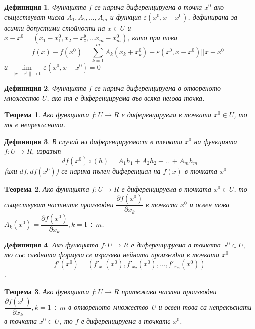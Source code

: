 \documentclass[fleqn]{article}
\newtheorem{theorem}{Tеорема}[subsection]
\newtheorem{definition}{Дефиниция}[subsection]
\begin{document}
\begin{definition}
Функцията $f$ се нарича диференцируема в точка $x^0$ ако съществуват числа $A_1, A_2, ..., A_m$ и функция $\varepsilon (x^0, x - x^0)$, дефинирана за всички допустими стойности на $x \in U$ и $x - x^0 = (x_1 - x_1 ^0, x_2 - x_2 ^0,... x_m - x_m ^0)$, като при това 
$$f(x) - f(x^0) = \sum_{k=1}^{m} A_k(x_k + x_k ^ 0) + \varepsilon (x^0, x - x^0) ||x - x^0||$$ 
и $\lim\limits_{|| x - x^0|| \rightarrow 0}\varepsilon (x^0, x - x^0) = 0$
\end{definition}

\begin{definition}
Функцията $f$ се нарича диференцируема в отвореното множество $U$, ако тя е диференцируема във всяка негова точка. 
\end{definition}

\begin{theorem}
Ако функцията $f: U \rightarrow R$ е диференцируема в точката $x^0 \in U$, то тя е непрекъсната. 
\end{theorem}

\begin{definition}
В случай на диференцируемост в точката $x^0$ на функцията $f: U \rightarrow R$, изразът 
$$df(x^0) \circ (h) = A_1 h_1 + A_2 h_2 + ... + A_m h_m$$
(или $df, df(x^0)$) се нарича пълен диференциал на $f(x)$ в точката $x^0$
\end{definition}

\begin{theorem}
Ако функцията $f: U \rightarrow R$ е диференцируема в точката $x^0 \in U$, то съществуват частните производни $\dfrac{\partial f(x^0)}{\partial x_k}$ в точката $x^0$ и освен това $A_k(x^0) = \dfrac{\partial f(x^0)}{\partial x_k}, k = 1 \div m$.
\end{theorem}

\begin{definition}
Ако функцията $f: U \rightarrow R$ е диференцируема в точката $x^0 \in U$, то със следната формула се изразява нейната производна в точката $x^0$
$$f'(x^0) = (f'_{x_1}(x^0), f'_{x_2}(x^0), ..., f'_{x_m}(x^0))$$.

\end{definition}

\begin{theorem}
Ако функцията $f: U \rightarrow R$ притежава частни производни $\dfrac{\partial f(x^0)}{\partial x_k}, k = 1 \div m$ в отвореното множество U и освен това са непрекъснати в точката $x^0 \in U$, то $f$ е диференцируема в точката $x^0$.
\end{theorem}
\end{document}
